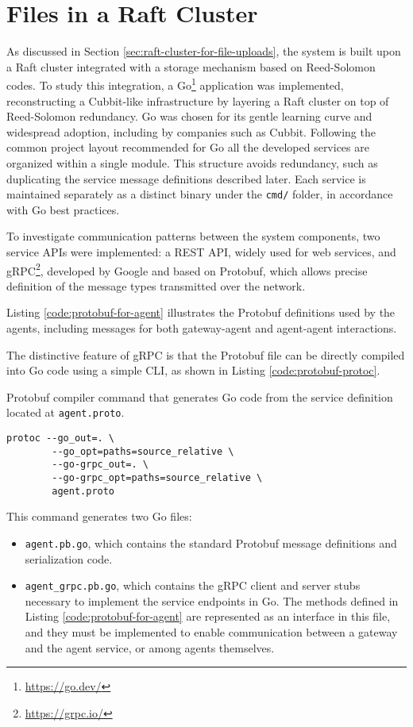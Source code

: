 \section{Files in a Raft Cluster}

As discussed in Section \ref{sec:raft-cluster-for-file-uploads}, the system is built upon a Raft cluster integrated with a storage mechanism based on Reed-Solomon codes. To study this integration, a Go\footnote{\url{https://go.dev/}} application was implemented, reconstructing a Cubbit-like infrastructure by layering a Raft cluster on top of Reed-Solomon redundancy. Go was chosen for its gentle learning curve and widespread adoption, including by companies such as Cubbit. Following the common project layout recommended for Go\cite{go-modules-layout} all the developed services are organized within a single module. This structure avoids redundancy, such as duplicating the service message definitions described later. Each service is maintained separately as a distinct binary under the \texttt{cmd/} folder, in accordance with Go best practices.



To investigate communication patterns between the system components, two service APIs were implemented: a REST API, widely used for web services, and gRPC\footnote{\url{https://grpc.io/}}, developed by Google and based on Protobuf, which allows precise definition of the message types transmitted over the network.

Listing \ref{code:protobuf-for-agent} illustrates the Protobuf definitions used by the agents, including messages for both gateway-agent and agent-agent interactions.

The distinctive feature of gRPC is that the Protobuf file can be directly compiled into Go code using a simple CLI, as shown in Listing \ref{code:protobuf-protoc}.

\begin{listing}
\caption{Protobuf compiler command that generates Go code from the service definition located at \texttt{agent.proto}.}
\label{code:protobuf-protoc}
\begin{verbatim}
protoc --go_out=. \
        --go_opt=paths=source_relative \
        --go-grpc_out=. \
        --go-grpc_opt=paths=source_relative \
        agent.proto
\end{verbatim}
\end{listing}

This command generates two Go files: 
\begin{itemize}
    \item \texttt{agent.pb.go}, which contains the standard Protobuf message definitions and serialization code.
    \item \texttt{agent\_grpc.pb.go}, which contains the gRPC client and server stubs necessary to implement the service endpoints in Go. The methods defined in Listing \ref{code:protobuf-for-agent} are represented as an interface in this file, and they must be implemented to enable communication between a gateway and the agent service, or among agents themselves.
\end{itemize}

